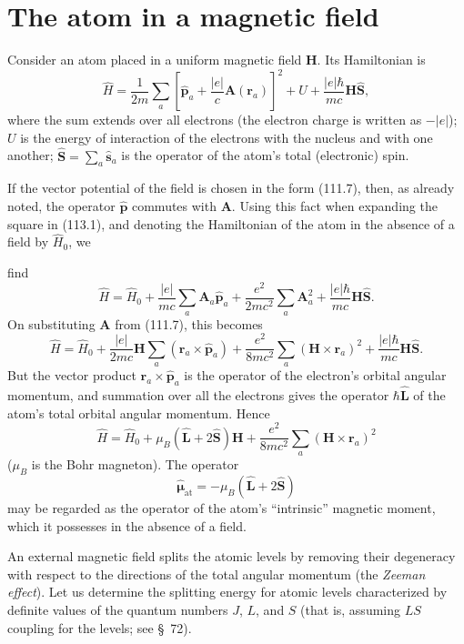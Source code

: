 \section{The atom in a magnetic field}

Consider an atom placed in a uniform magnetic field $\mathbf H$. Its Hamiltonian is
\begin{equation}
 \hat H=\frac1{2m}\sum_a\left[\hat{\mathbf p}_a+\frac{|e|}{c}\mathbf A(\mathbf r_a)\right]^2+U+\frac{|e|\hbar}{mc}\mathbf H\hat{\mathbf S},
 \tag{113.1}
\end{equation}
where the sum extends over all electrons (the electron charge is written as $-|e|$); $U$ is the energy of interaction of the electrons with the nucleus and with one another; $\hat{\mathbf S}=\sum_a\hat{\mathbf s}_a$ is the operator of the atom's total (electronic) spin.

If the vector potential of the field is chosen in the form (111.7), then, as already noted, the operator $\hat{\mathbf p}$ commutes with $\mathbf A$. Using this fact when expanding the square in (113.1), and denoting the Hamiltonian of the atom in the absence of a field by $\hat H_0$, we

find
\[
 \hat H=\hat H_0+\frac{|e|}{mc}\sum_a\mathbf A_a\hat{\mathbf p}_a+\frac{e^2}{2mc^2}\sum_a\mathbf A_a^2+\frac{|e|\hbar}{mc}\mathbf H\hat{\mathbf S}.
\]
On substituting $\mathbf A$ from (111.7), this becomes
\[
 \hat H=\hat H_0+\frac{|e|}{2mc}\mathbf H\sum_a(\mathbf r_a\times\hat{\mathbf p}_a)+\frac{e^2}{8mc^2}\sum_a(\mathbf H\times\mathbf r_a)^2+\frac{|e|\hbar}{mc}\mathbf H\hat{\mathbf S}.
\]
But the vector product $\mathbf r_a\times\hat{\mathbf p}_a$ is the operator of the electron's orbital angular momentum, and summation over all the electrons gives the operator $\hbar\hat{\mathbf L}$ of the atom's total orbital angular momentum. Hence
\begin{equation}
 \hat H=\hat H_0+\mu_B(\hat{\mathbf L}+2\hat{\mathbf S})\mathbf H+\frac{e^2}{8mc^2}\sum_a(\mathbf H\times\mathbf r_a)^2
 \tag{113.2}
\end{equation}
($\mu_B$ is the Bohr magneton). The operator
\begin{equation}
 \hat{\boldsymbol\mu}_{\text{at}}=-\mu_B(\hat{\mathbf L}+2\hat{\mathbf S})
 \tag{113.3}
\end{equation}
may be regarded as the operator of the atom's ``intrinsic'' magnetic moment, which it possesses in the absence of a field.

An external magnetic field splits the atomic levels by removing their degeneracy with respect to the directions of the total angular momentum (the \emph{Zeeman effect}). Let us determine the splitting energy for atomic levels characterized by definite values of the quantum numbers $J$, $L$, and $S$ (that is, assuming $LS$ coupling for the levels; see §~72).

